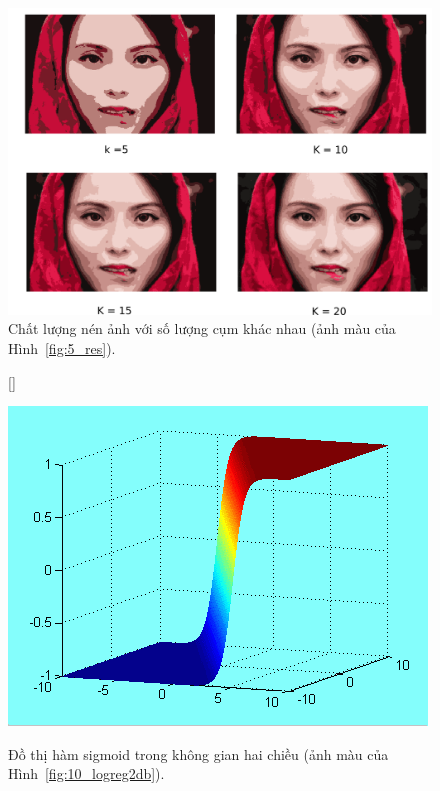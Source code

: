 \begin{figure}[t]
\centering
\includegraphics[width = \textwidth]{Chapters/03_SimpleML/4_kmeans/girl_all.png}
\caption[]{Chất lượng nén ảnh với số lượng cụm khác nhau (ảnh màu của Hình~\ref{fig:5_res}).}
\label{fig:5_res_c}
\end{figure}

\begin{figure}[t]
\centering
{}[\FBwidth]
{
\caption{Đồ thị hàm sigmoid trong không gian hai chiều (ảnh màu của Hình~\ref{fig:10_logreg2db}).}
\label{fig:10_logreg2db_c}}
{
\includegraphics[width=.95\linewidth]{Chapters/05_NeuralNetworks/10_logisticregression/plaszczyzna.png}
}
\end{figure}

